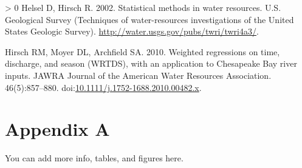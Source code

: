 \documentclass[fontsize=11pt,
titlepage=true,
footnotes=multiple
]{scrartcl}
\newlength{\cslhangindent}
\newenvironment{CSLReferences}[3] %
 {%
  \setlength{\parindent}{0pt}
  \ifodd #1 \everypar{\setlength{\hangindent}{\cslhangindent}}\ignorespaces\fi
  \ifnum #2 > 0
  \setlength{\parskip}{#2\baselineskip}
  \fi
 }%
 {}
\begin{document}
\hypertarget{refs}{}
\begin{CSLReferences}{0}{0}
\leavevmode\hypertarget{ref-helsel_statistical_2002}{}%
Helsel D, Hirsch R. 2002. Statistical methods in water resources. U.S. Geological Survey (Techniques of water-resources investigations of the {United States Geologic Survey}). \url{http://water.usgs.gov/pubs/twri/twri4a3/}.

\leavevmode\hypertarget{ref-hirsch2010weighted}{}%
Hirsch RM, Moyer DL, Archfield SA. 2010. Weighted regressions on time, discharge, and season {(WRTDS)}, with an application to {Chesapeake} {Bay} river inputs. JAWRA Journal of the American Water Resources Association. 46(5):857--880. doi:\href{https://doi.org/10.1111/j.1752-1688.2010.00482.x}{10.1111/j.1752-1688.2010.00482.x}.

\end{CSLReferences}

\newpage

\hypertarget{appendix-a}{%
\section*{Appendix A}\label{appendix-a}}

You can add more info, tables, and figures here.
\end{document}
